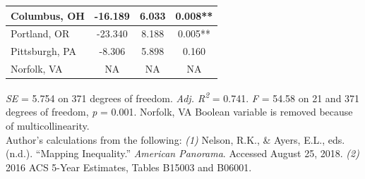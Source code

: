 \documentclass[paper=letter, fontsize=12pt]{scrartcl} %
\begin{document}
\begin{table}
\begin{center}
\begin{tabular}{|| l | c c c ||}
			\hline 
			Columbus, OH & -16.189 & 6.033 & 0.008**\\ 
			\hline 
			Portland, OR & -23.340 & 8.188 & 0.005**\\ 
			\hline 
			Pittsburgh, PA & -8.306 & 5.898 & 0.160\\ 
			\hline 
			Norfolk, VA & NA & NA & NA\\ 
			\hline 
		\end{tabular}
	\end{center}
\textit{SE} = 5.754 on 371 degrees of freedom. \textit{Adj. R\textsuperscript{2}} = 0.741. \textit{F} = 54.58 on 21 and 371 degrees of freedom, \textit{p} = 0.001. Norfolk, VA Boolean variable is removed because of multicollinearity.\\
Author's calculations from the following: \textit{(1)} Nelson, R.K., \& Ayers, E.L., eds. (n.d.). ``Mapping Inequality.'' \textit{American Panorama}. Accessed August 25, 2018. \textit{(2)} 2016 ACS 5-Year Estimates, Tables B15003 and B06001.
\end{table}
\end{document}
